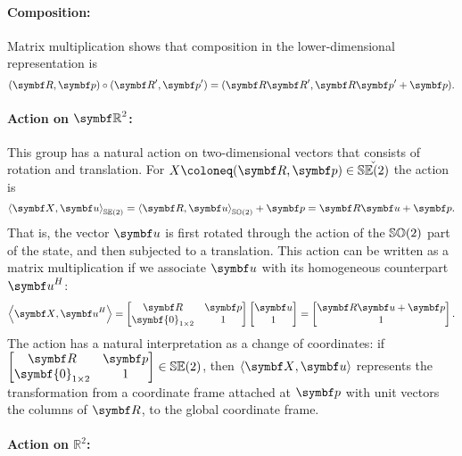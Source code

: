 \paragraph{Composition:} Matrix multiplication shows that composition in the lower-dimensional representation is
\begin{equation}
  (\bR, \bp) \circ (\bR', \bp') = (\bR \bR', \bR \bp' + \bp).
\end{equation}

\paragraph{Action on $\mathbb{\bR}^2$:}
This group has a natural action on two-dimensional vectors that consists of rotation and translation. For $X \coloneq (\bR, \bp) \in \check {\SEtwo}$ the action is
\begin{equation}
  \left \langle \X, \bu \right \rangle_{\SEtwo} = \left \langle \bR, \bu \right \rangle_{\SOtwo} + \bp = \bR \bu + \bp.
\end{equation}
That is, the vector $\bu$ is first rotated through the action of the ${\mathbb{SO}(2)}$ part of the state, and then subjected to a translation. This action can be written as a matrix multiplication if we associate $\bu$ with its homogeneous counterpart $\bu^H$:
\begin{equation}
  \left \langle \X, \bu^H \right \rangle = \begin{bmatrix}
    \bR & \bp \\ \symbf{0}_{1 \times 2} & 1
  \end{bmatrix} \begin{bmatrix}
    \symbf u \\ 1
  \end{bmatrix} = \begin{bmatrix}
    \bR \bu + \bp \\ 1
  \end{bmatrix}.
\end{equation}
The action has a natural interpretation as a change of coordinates: if $\begin{bmatrix} \bR & \bp \\ \symbf{0}_{1 \times 2} & 1 \end{bmatrix} \in \SEtwo$, then $\left \langle \X, \bu \right \rangle$ represents the transformation from a coordinate frame attached at $\bp$ with unit vectors the columns of $\bR$, to the global coordinate frame.

\paragraph{Action on $\mathbb{R}^2$:}

